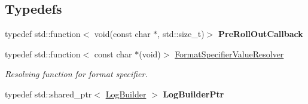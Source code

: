\subsection*{Typedefs}
\begin{DoxyCompactItemize}
\item 
\mbox{\label{namespaceel_aeb764b890a6f3cd41d2726bcd4e9c0cf}} 
typedef std\+::function$<$ void(const char $\ast$, std\+::size\+\_\+t)$>$ {\bfseries Pre\+Roll\+Out\+Callback}
\item 
\mbox{\label{namespaceel_ab3cd18425a11df166a041d9024b8b5c6}} 
typedef std\+::function$<$ const char $\ast$(void)$>$ \hyperlink{namespaceel_ab3cd18425a11df166a041d9024b8b5c6}{Format\+Specifier\+Value\+Resolver}
\begin{DoxyCompactList}\small\item\em Resolving function for format specifier. \end{DoxyCompactList}\item 
\mbox{\label{namespaceel_ad4c4b2f7d70a4b02568a9f70724a6b39}} 
typedef std\+::shared\+\_\+ptr$<$ \hyperlink{classel_1_1_log_builder}{Log\+Builder} $>$ {\bfseries Log\+Builder\+Ptr}
\end{DoxyCompactItemize}
